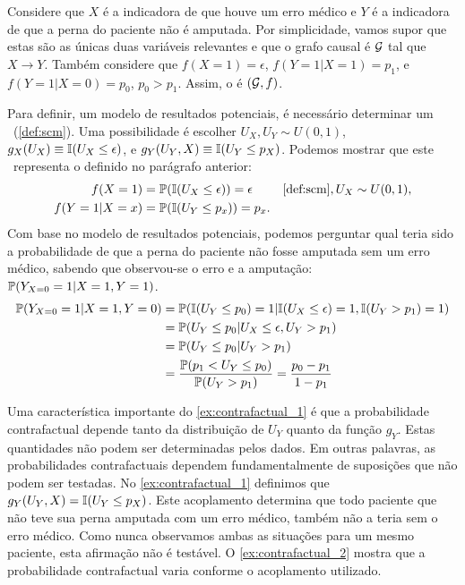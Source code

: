 \begin{example}
 \label{ex:contrafactual_1}
 Considere que $X$ é a indicadora de que houve um erro médico e
 $Y$ é a indicadora de que a perna do paciente não é amputada.
 Por simplicidade, vamos supor que estas são
 as únicas duas variáveis relevantes e que 
 o grafo causal é $\sG$ tal que $X \rightarrow Y$.
 Também considere que $f(X = 1) = \epsilon$,
 $f(Y=1|X=1) = p_1$, e $f(Y=1|X=0) = p_0$, $p_0 > p_1$.
 Assim, o \CM é $(\sG, f)$. 
 
 Para definir, um modelo de resultados potenciais,
 é necessário determinar um \SCM \ (\cref{def:scm}).
 Uma possibilidade é escolher $U_X, U_Y \sim U(0,1)$,
 $g_X(U_X) \equiv \I(U_X \leq \epsilon)$, e
 $g_Y(U_Y, X) \equiv \I(U_Y \leq p_X)$.
 Podemos mostrar que este \SCM \ representa
 o \CM definido no parágrafo anterior:
 \begin{align*}
  f(X=1)
  &= \P(\I(U_X \leq \epsilon)) = \epsilon
  & \text{\cref{def:scm}}, U_X \sim U(0,1), \\
  f(Y=1|X=x)
  &= \P(\I(U_Y \leq p_x)) = p_x.
 \end{align*}
 Com base no modelo de resultados potenciais,
 podemos perguntar qual teria sido a probabilidade
 de que a perna do paciente não fosse amputada sem
 um erro médico, sabendo que observou-se
 o erro e a amputação: $\P(Y_{X=0}=1|X=1,Y=1)$.
 \begin{align*}
  \P(Y_{X=0}=1|X=1,Y=0)
  &= \P(\I(U_Y \leq p_0) = 1|\I(U_X \leq \epsilon) = 1, \I(U_Y > p_1) = 1) \\
  &= \P(U_Y \leq p_0|U_X \leq \epsilon, U_Y > p_1) \\
  &= \P(U_Y \leq p_0|U_Y > p_1) \\
  &= \frac{\P(p_1 < U_Y \leq p_0)}{\P(U_Y > p_1)} = \frac{p_0-p_1}{1-p_1}
 \end{align*}
\end{example}

Uma característica importante do \cref{ex:contrafactual_1} é que 
a probabilidade contrafactual depende 
tanto da distribuição de $U_Y$ quanto da função $g_Y$.
Estas quantidades não podem ser determinadas pelos dados.
Em outras palavras, as probabilidades contrafactuais dependem
fundamentalmente de suposições que não podem ser testadas.
No \cref{ex:contrafactual_1} definimos que 
$g_Y(U_Y, X) = \I(U_Y \leq p_X)$.
Este acoplamento determina que todo paciente que
não teve sua perna amputada com um erro médico, 
também não a teria sem o erro médico.
Como nunca observamos ambas as situações para
um mesmo paciente, esta afirmação não é testável.
O \cref{ex:contrafactual_2} mostra que
a probabilidade contrafactual varia conforme
o acoplamento utilizado.

